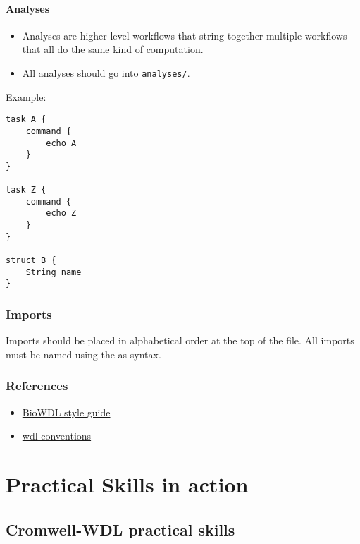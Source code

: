 \documentclass[
]{book}
\providecommand{\tightlist}{%
  \setlength{\itemsep}{0pt}\setlength{\parskip}{0pt}}
\begin{document}
\hypertarget{analyses}{%
\subsection{Analyses}\label{analyses}}

\begin{itemize}
\tightlist
\item
  Analyses are higher level workflows that string together multiple workflows
  that all do the same kind of computation.
\item
  All analyses should go into \texttt{analyses/}.
\end{itemize}

Example:

\begin{verbatim}
task A {
    command {
        echo A
    }
}

task Z {
    command {
        echo Z
    }
}

struct B {
    String name
}
\end{verbatim}

\hypertarget{imports-1}{%
\section{Imports}\label{imports-1}}

Imports should be placed in alphabetical order at the top of the file. All
imports must be named using the as syntax.

\hypertarget{references-2}{%
\section{References}\label{references-2}}

\begin{itemize}
\tightlist
\item
  \href{https://biowdl.github.io/styleGuidelines.html}{BioWDL style guide}
\item
  \href{https://github.com/mondrian-scwgs/mondrian/wiki/wdl_conventions}{wdl conventions}
\end{itemize}

\hypertarget{part-practical-skills-in-action}{%
\part*{Practical Skills in action}\label{part-practical-skills-in-action}}

\hypertarget{cromwell-wdl-practical-skills}{%
\chapter{Cromwell-WDL practical skills}\label{cromwell-wdl-practical-skills}}
\end{document}
